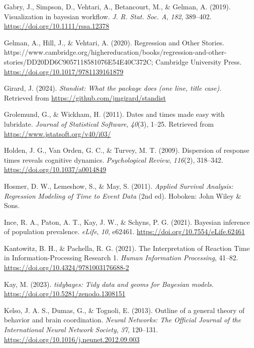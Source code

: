 \documentclass[
  man, donotrepeattitle,floatsintext]{apa6}
\newlength{\cslhangindent}
\newenvironment{CSLReferences}[2] %
 {\begin{list}{}{%
  \setlength{\itemindent}{0pt}
  \setlength{\leftmargin}{0pt}
  \setlength{\parsep}{0pt}
  \ifodd #1
   \setlength{\leftmargin}{\cslhangindent}
   \setlength{\itemindent}{-1\cslhangindent}
  \fi
  \setlength{\itemsep}{#2\baselineskip}}}
 {\end{list}}
\begin{document}
\begin{CSLReferences}{1}{0}
Gabry, J., Simpson, D., Vehtari, A., Betancourt, M., \& Gelman, A. (2019). Visualization in bayesian workflow. \emph{J. R. Stat. Soc. A}, \emph{182}, 389--402. \url{https://doi.org/10.1111/rssa.12378}

Gelman, A., Hill, J., \& Vehtari, A. (2020). Regression and {Other Stories}. https://www.cambridge.org/highereducation/books/regression-and-other-stories/DD20DD6C9057118581076E54E40C372C; Cambridge University Press. \url{https://doi.org/10.1017/9781139161879}

Girard, J. (2024). \emph{Standist: What the package does (one line, title case)}. Retrieved from \url{https://github.com/jmgirard/standist}

Grolemund, G., \& Wickham, H. (2011). Dates and times made easy with {lubridate}. \emph{Journal of Statistical Software}, \emph{40}(3), 1--25. Retrieved from \url{https://www.jstatsoft.org/v40/i03/}

Holden, J. G., Van Orden, G. C., \& Turvey, M. T. (2009). Dispersion of response times reveals cognitive dynamics. \emph{Psychological Review}, \emph{116}(2), 318--342. \url{https://doi.org/10.1037/a0014849}

Hosmer, D. W., Lemeshow, S., \& May, S. (2011). \emph{Applied {Survival Analysis}: {Regression Modeling} of {Time} to {Event Data}} (2nd ed). Hoboken: John Wiley \& Sons.

Ince, R. A., Paton, A. T., Kay, J. W., \& Schyns, P. G. (2021). Bayesian inference of population prevalence. \emph{eLife}, \emph{10}, e62461. \url{https://doi.org/10.7554/eLife.62461}

Kantowitz, B. H., \& Pachella, R. G. (2021). The {Interpretation} of {Reaction Time} in {Information-Processing Research} 1. \emph{Human Information Processing}, 41--82. \url{https://doi.org/10.4324/9781003176688-2}

Kay, M. (2023). \emph{{tidybayes}: Tidy data and geoms for {Bayesian} models}. \url{https://doi.org/10.5281/zenodo.1308151}

Kelso, J. A. S., Dumas, G., \& Tognoli, E. (2013). Outline of a general theory of behavior and brain coordination. \emph{Neural Networks: The Official Journal of the International Neural Network Society}, \emph{37}, 120--131. \url{https://doi.org/10.1016/j.neunet.2012.09.003}


\end{CSLReferences}
\end{document}
